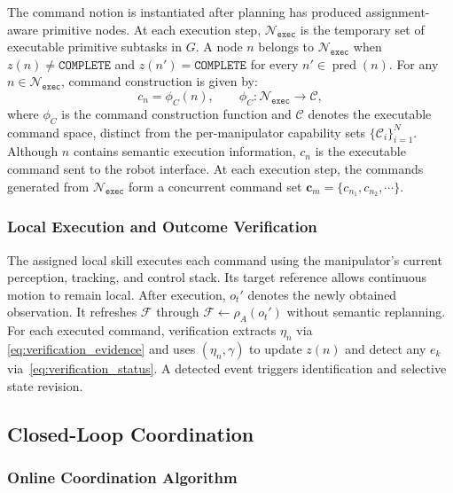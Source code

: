 The command notion  is
instantiated after planning has produced assignment-aware primitive nodes. At
each execution step, $\mathcal{N}_{\texttt{exec}}$ is the temporary set of
executable primitive subtasks in $G$. A node $n$
belongs to $\mathcal{N}_{\texttt{exec}}$ when
$z(n)\ne\texttt{COMPLETE}$ and $z(n')=\texttt{COMPLETE}$ for every
$n'\in\operatorname{pred}(n)$. For any
$n\in\mathcal{N}_{\texttt{exec}}$, command construction is given by:
\begin{equation}
 c_n=\phi_C(n),
 \qquad
 \phi_C:\mathcal{N}_{\texttt{exec}}\rightarrow\mathcal{C},
 \label{eq:execution_command}
\end{equation}
where $\phi_C$ is the command construction function and $\mathcal{C}$ denotes
the executable command space, distinct from the per-manipulator capability
sets $\{\mathcal{C}_i\}_{i=1}^{N}$. Although $n$ contains semantic execution
information, $c_n$ is the executable command sent to the robot interface. At
each execution step, the commands generated from
$\mathcal{N}_{\texttt{exec}}$ form a concurrent command set
$\mathbf{c}_m=\{c_{n_1},c_{n_2},\cdots\}$.

\subsubsection{Local Execution and Outcome Verification}
\label{sec:manipulator_local_execution}

The assigned local skill executes each command using the manipulator's current
perception, tracking, and control stack. Its target reference allows continuous
motion to remain local. After execution, $o_t'$ denotes the newly obtained
observation. It refreshes $\mathcal{F}$ through
$\mathcal{F}\gets\rho_A(o_t')$ without semantic
replanning. For each executed command, verification extracts $\eta_n$ via
\eqref{eq:verification_evidence} and uses $(\eta_n,\gamma)$ to update $z(n)$ and
detect any $e_k$ via~\eqref{eq:verification_status}. A detected event triggers
identification and selective state revision.

\subsection{Closed-Loop Coordination}
\label{sec:closed_loop_coordination}

\subsubsection{Online Coordination Algorithm}

